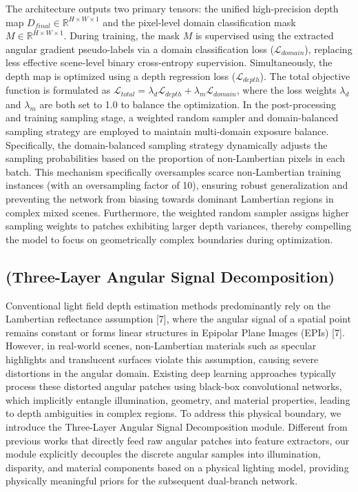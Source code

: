 The architecture outputs two primary tensors: the unified high-precision depth map $D_{final} \in \mathbb{R}^{H \times W \times 1}$ and the pixel-level domain classification mask $M \in \mathbb{R}^{H \times W \times 1}$. During training, the mask $M$ is supervised using the extracted angular gradient pseudo-labels via a domain classification loss ($\mathcal{L}_{domain}$), replacing less effective scene-level binary cross-entropy supervision. Simultaneously, the depth map is optimized using a depth regression loss ($\mathcal{L}_{depth}$). The total objective function is formulated as $\mathcal{L}_{total} = \lambda_d \mathcal{L}_{depth} + \lambda_m \mathcal{L}_{domain}$, where the loss weights $\lambda_d$ and $\lambda_m$ are both set to 1.0 to balance the optimization. In the post-processing and training sampling stage, a weighted random sampler and domain-balanced sampling strategy are employed to maintain multi-domain exposure balance. Specifically, the domain-balanced sampling strategy dynamically adjusts the sampling probabilities based on the proportion of non-Lambertian pixels in each batch. This mechanism specifically oversamples scarce non-Lambertian training instances (with an oversampling factor of 10), ensuring robust generalization and preventing the network from biasing towards dominant Lambertian regions in complex mixed scenes. Furthermore, the weighted random sampler assigns higher sampling weights to patches exhibiting larger depth variances, thereby compelling the model to focus on geometrically complex boundaries during optimization.

\subsection{(Three-Layer Angular Signal Decomposition)}

Conventional light field depth estimation methods predominantly rely on the Lambertian reflectance assumption [7], where the angular signal of a spatial point remains constant or forms linear structures in Epipolar Plane Images (EPIs) [7]. However, in real-world scenes, non-Lambertian materials such as specular highlights and translucent surfaces violate this assumption, causing severe distortions in the angular domain. Existing deep learning approaches typically process these distorted angular patches using black-box convolutional networks, which implicitly entangle illumination, geometry, and material properties, leading to depth ambiguities in complex regions. To address this physical boundary, we introduce the Three-Layer Angular Signal Decomposition module. Different from previous works that directly feed raw angular patches into feature extractors, our module explicitly decouples the discrete angular samples into illumination, disparity, and material components based on a physical lighting model, providing physically meaningful priors for the subsequent dual-branch network.

